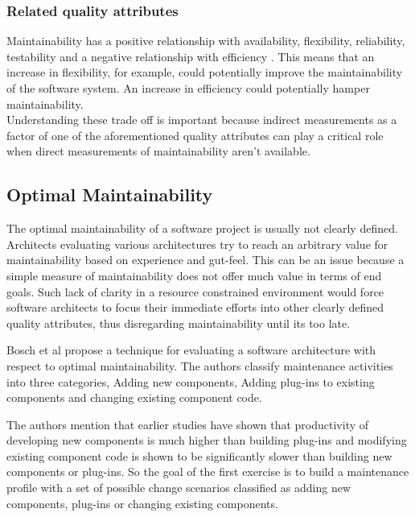 \documentclass[15pt]{article}
\begin{document}
\subsubsection{Related quality attributes}
Maintainability has a positive relationship with availability, flexibility, reliability, testability and a negative relationship with efficiency \cite{karl_software_2003}. This means that an increase in flexibility, for example, could potentially improve the maintainability of the software system. An increase in efficiency could potentially hamper maintainability.\\

Understanding these trade off is important because indirect measurements as a factor of one of the aforementioned quality attributes can play a critical role when direct measurements of maintainability aren't available.

\subsection{Optimal Maintainability}

The optimal maintainability of a software project is usually not clearly defined. Architects evaluating various architectures try to reach an arbitrary value for maintainability based on experience and gut-feel. This can be an issue because a simple measure of maintainability does not offer much value in terms of end goals. Such lack of clarity in a resource constrained environment would force software architects to focus their immediate efforts into other clearly defined quality attributes, thus disregarding maintainability until its too late.

Bosch et al \cite{bosch_assessing_2001} propose a technique for evaluating a software architecture with respect to optimal maintainability. The authors classify maintenance activities into three categories, Adding new components, Adding plug-ins to existing components and changing existing component code.

The authors mention that earlier studies \cite{henry_quantitative_1997} \cite{maxwell_software_1996} have shown that productivity of developing new components is much higher than building plug-ins and modifying existing component code is shown to be significantly slower than building new components or plug-ins. So the goal of the first exercise is to build a maintenance profile with a set of possible change scenarios classified as adding new components, plug-ins or changing existing components. 
\end{document}
